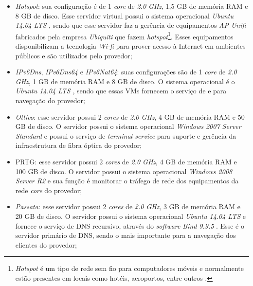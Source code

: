 \begin{itemize}
 \item \textit{Hotspot}: sua configuração é de 1 \textit{core} de \textit{2.0 GHz}, 1,5 GB de memória \ac{RAM} e 8 GB de disco. 
 Esse servidor virtual possui o sistema operacional \textit{Ubuntu 14.04 \ac{LTS}} \cite{ubuntu}, sendo que esse servidor faz a gerência de 
 equipamentos \textit{AP Unifi} fabricados pela empresa \textit{Ubiquiti} que fazem \textit{hotspot}\footnote[1]{\textit{Hotspot} é um tipo de 
 rede sem fio para computadores móveis e normalmente estão presentes em locais como hotéis, aeroportos, entre outros \cite{tanenbaum2011}.}. 
 Esses equipamentos disponibilizam a tecnologia \textit{Wi-fi} para prover acesso à Internet em ambientes públicos e são utilizados pelo provedor;
 
 \item \textit{IPv6Dns}, \textit{IPv6Dns64} e \textit{IPv6Nat64}: suas configurações são de 1 \textit{core} de \textit{2.0 GHz}, 
 1 GB de memória \ac{RAM} e 8 GB de disco. O sistema operacional é o \textit{Ubuntu 14.04 \ac{LTS}} \cite{ubuntu}, sendo que essas \acp{VM}
 fornecem o serviço de  e  para navegação  \cite{ipv6} do provedor;
 
 \item \textit{Ottico}: esse servidor possui 2 \textit{cores} de \textit{2.0 GHz}, 4 GB de memória \ac{RAM} e 50 GB de disco. 
 O servidor possui o sistema operacional \textit{Windows 2007 Server Standard} e possui o serviço de \textit{terminal service} para suporte e 
 gerência da infraestrutura de fibra óptica do provedor;
 
 \item \ac{PRTG}: esse servidor possui 2 \textit{cores} de \textit{2.0 GHz}, 4 GB de memória \ac{RAM} e 100 GB de disco. 
 O servidor possui o sistema operacional \textit{Windows 2008 Server R2} e sua função é monitorar o tráfego de rede dos equipamentos da 
 rede \textit{core} do provedor;
 
 \item \textit{Passata}: esse servidor possui 2 \textit{cores} de \textit{2.0 GHz}, 3 GB de memória \ac{RAM} e 20 GB de disco. 
 O servidor possui o sistema operacional \textit{Ubuntu 14.04 \ac{LTS}} \cite{ubuntu} e fornece o serviço de \ac{DNS} recursivo, através do 
 \textit{software} \textit{Bind 9.9.5} \cite{bind}. Esse é o servidor primário de \ac{DNS}, sendo o mais importante para a navegação dos 
 clientes do provedor;
 

\end{itemize}
